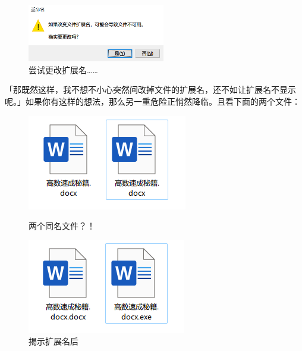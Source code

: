 \begin{figure}[htb!]
  \centering
  \includegraphics[width=6cm]{assets/basic/Warning_when_changing_extension.png}
  \caption{尝试更改扩展名……}
  \label{fig:Warning_when_changing_extension}
\end{figure}

「那既然这样，我不想不小心突然间改掉文件的扩展名，还不如让扩展名不显示呢。」如果你有这样的想法，那么另一重危险正悄然降临。且看下面的两个文件：

\begin{figure}[htb!]
  \centering
  \begin{minipage}{.48\textwidth}
    \centering
    \includegraphics[width=.9\textwidth]{assets/basic/fake_doc.png}
    \caption{两个同名文件？！}
    \label{fig:fake_doc}
  \end{minipage}
  \begin{minipage}{.48\textwidth}
    \centering
    \includegraphics[width=.9\textwidth]{assets/basic/fake_doc_revealed.png}
    \caption{揭示扩展名后}
    \label{fig:fake_doc_revealed}
  \end{minipage}
\end{figure}

